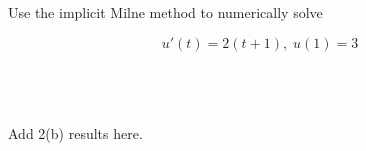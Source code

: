 Use the implicit Milne method to numerically solve

$$
u'(t) = 2(t + 1),\; u(1) = 3
$$

\begin{solution}\ \\\\
\ \\

Add 2(b) results here.
\end{solution}
